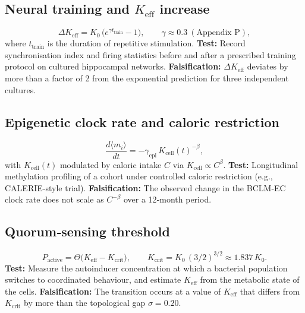 \documentclass[11pt,a4paper]{article}
\begin{document}
\subsection{Neural training and $K_{\mathrm{eff}}$ increase}

\begin{equation}\label{eq:pred-neural}
	\Delta K_{\mathrm{eff}} = K_0\,
	\bigl(e^{\gamma t_{\mathrm{train}}}-1\bigr),\qquad
	\gamma \approx 0.3\ (\text{Appendix~P}),
\end{equation}
where $t_{\mathrm{train}}$ is the duration of repetitive
stimulation.
\textbf{Test:} Record synchronisation index and firing statistics
before and after a prescribed training protocol on cultured
hippocampal networks.
\textbf{Falsification:} $\Delta K_{\mathrm{eff}}$ deviates by
more than a factor of 2 from the exponential prediction for three
independent cultures.

\subsection{Epigenetic clock rate and caloric restriction}

\begin{equation}\label{eq:pred-epi}
	\frac{d\langle m_i\rangle}{dt} =
	-\gamma_{\mathrm{epi}}\, K_{\mathrm{cell}}(t)^{-\beta},
\end{equation}
with $K_{\mathrm{cell}}(t)$ modulated by caloric intake $C$ via
$K_{\mathrm{cell}} \propto C^{\beta}$.
\textbf{Test:} Longitudinal methylation profiling of a cohort
under controlled caloric restriction (e.g., CALERIE‑style trial).
\textbf{Falsification:} The observed change in the BCLM‑EC
clock rate does not scale as $C^{-\beta}$ over a 12‑month period.

\subsection{Quorum‑sensing threshold}

\begin{equation}\label{eq:pred-qs}
	P_{\mathrm{active}} =
	\Theta\!\bigl(K_{\mathrm{eff}} - K_{\mathrm{crit}}\bigr),\qquad
	K_{\mathrm{crit}} = K_0\,(3/2)^{3/2} \approx 1.837\,K_0 .
\end{equation}
\textbf{Test:} Measure the autoinducer concentration at which a
bacterial population switches to coordinated behaviour, and
estimate $K_{\mathrm{eff}}$ from the metabolic state of the cells.
\textbf{Falsification:} The transition occurs at a value of
$K_{\mathrm{eff}}$ that differs from $K_{\mathrm{crit}}$ by
more than the topological gap $\sigma=0.20$.
\end{document}
